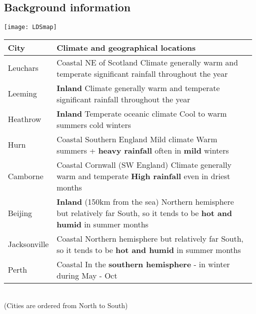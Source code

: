 \subsection{Background information}
\texttt{[image: LDSmap]}\\
\begin{tabular}{|p{2cm}|p{15cm}|}
	\hline
	\textbf{City} & \textbf{Climate and geographical locations} \\
	\hline
	Leuchars & Coastal \newline NE of Scotland \newline Climate generally warm and temperate \newline significant rainfall throughout the year\\
	\hline
	Leeming & \textbf{Inland} \newline Climate generally warm and temperate \newline significant rainfall throughout the year\\
	\hline
	Heathrow  & \textbf{Inland} \newline Temperate oceanic climate \newline Cool to warm summers \newline cold winters\\
	\hline
	Hurn  & Coastal \newline Southern England \newline Mild climate \newline Warm summers + \textbf{heavy rainfall} often in \textbf{mild} winters\\
	\hline
	Camborne & Coastal \newline Cornwall (SW England) \newline Climate generally warm and temperate \newline \textbf{High rainfall} even in driest months\\
	\hline
	Beijing  & \textbf{Inland} (150km from the sea) \newline Northern hemisphere but relatively far South, so it tends to be \textbf{hot and humid} in summer months\\
	\hline
	Jacksonville  & Coastal \newline Northern hemisphere but relatively far South, so it tends to be \textbf{hot and humid} in summer months \\
	\hline
	Perth & Coastal \newline In the \textbf{southern hemisphere} - in winter during May - Oct\\
	\hline
\end{tabular}\\
(Cities are ordered from North to South)

